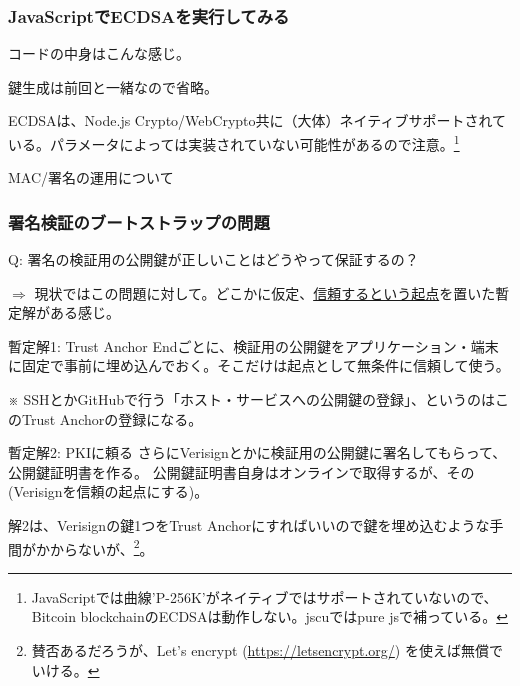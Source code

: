 \documentclass[12pt,dvipdfmx]{beamer}
\begin{document}
\begin{frame}[fragile]
\frametitle{JavaScriptでECDSAを実行してみる}
\end{frame}

\begin{frame}[fragile]
コードの中身はこんな感じ。

鍵生成は前回と一緒なので省略。
\end{frame}

\begin{frame}
ECDSAは、Node.js Crypto/WebCrypto共に（大体）ネイティブサポートされている。パラメータによっては実装されていない可能性があるので注意。\footnote[frame]{\scriptsize JavaScriptでは曲線'P-256K'がネイティブではサポートされていないので、Bitcoin blockchainのECDSAは動作しない。jscuではpure jsで補っている。}
\end{frame}

\begin{frame}
\centering
{\Large MAC/署名の運用について}
\end{frame}

\begin{frame}
\frametitle{署名検証のブートストラップの問題}

Q: \alert{署名の検証用の公開鍵が正しいことはどうやって保証するの？}

\vspace{2ex}

$\Rightarrow$ 現状ではこの問題に対して。どこかに仮定、\underline{信頼するという起点}を置いた暫定解がある感じ。


\end{frame}

\begin{frame}
\begin{block}{暫定解1: Trust Anchor}
Endごとに、\alert{検証用の公開鍵をアプリケーション・端末に固定で事前に埋め込んでおく}。そこだけは起点として無条件に信頼して使う。
\end{block}

※ SSHとかGitHubで行う「ホスト・サービスへの公開鍵の登録」、というのはこのTrust Anchorの登録になる。
\end{frame}

\begin{frame}
 
\begin{block}{暫定解2: PKIに頼る}
さらに\alert{Verisignとかに検証用の公開鍵に署名してもらって、公開鍵証明書を作る}。
公開鍵証明書自身はオンラインで取得するが、その(Verisignを信頼の起点にする)。
\end{block}

解2は、Verisignの鍵1つをTrust Anchorにすればいいので鍵を埋め込むような手間がかからないが、\footnote[frame]{\scriptsize 賛否あるだろうが、Let's encrypt (\url{https://letsencrypt.org/}) を使えば無償でいける。}。


\end{frame}
\end{document}
